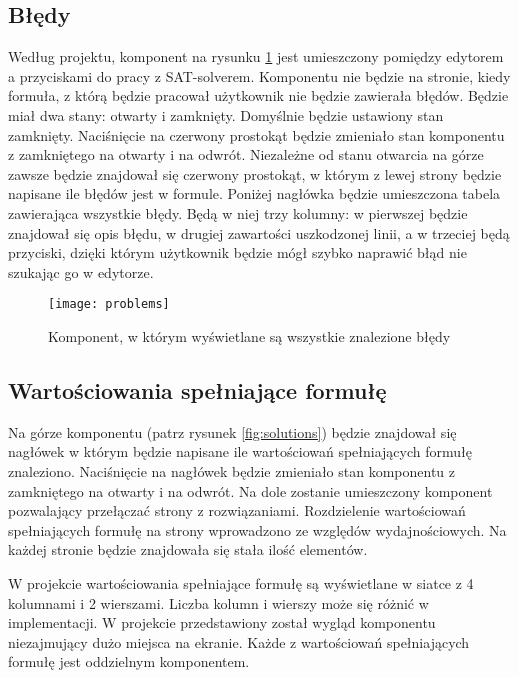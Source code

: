 \documentclass[a4paper,12pt]{book}
\theoremstyle{definition}
\begin{document}

\subsection{Błędy}

Według projektu, komponent na rysunku \ref{fig:problems} jest umieszczony pomiędzy edytorem a przyciskami do pracy z SAT-solverem. Komponentu nie będzie na stronie, kiedy formuła, z którą będzie pracował użytkownik nie będzie zawierała błędów. Będzie miał dwa stany: otwarty i zamknięty. Domyślnie będzie ustawiony stan zamknięty. Naciśnięcie na czerwony prostokąt będzie zmieniało stan komponentu z zamkniętego na otwarty i na odwrót. Niezależne od stanu otwarcia na górze zawsze będzie znajdował się czerwony prostokąt, w którym z lewej strony będzie napisane ile błędów jest w formule. Poniżej nagłówka będzie umieszczona tabela zawierająca wszystkie błędy. Będą w niej trzy kolumny: w pierwszej będzie znajdował się opis błędu, w drugiej zawartości uszkodzonej linii, a w trzeciej będą przyciski, dzięki którym użytkownik będzie mógł szybko naprawić błąd nie szukając go w edytorze.

\begin{figure}[ht]
    \centering
    \texttt{[image: problems]}
    \caption{Komponent, w którym wyświetlane są wszystkie znalezione błędy}
    \label{fig:problems}
\end{figure}

\subsection{Wartościowania spełniające formułę}

Na górze komponentu (patrz rysunek \ref{fig:solutions}) będzie znajdował się nagłówek w którym będzie napisane ile wartościowań spełniających formułę znaleziono. Naciśnięcie na nagłówek będzie zmieniało stan komponentu z zamkniętego na otwarty i na odwrót. Na dole zostanie umieszczony komponent pozwalający przełączać strony z rozwiązaniami. Rozdzielenie wartościowań spełniających formułę na strony wprowadzono ze względów wydajnościowych. Na każdej stronie będzie znajdowała się stała ilość elementów.

W projekcie wartościowania spełniające formułę są wyświetlane w siatce z 4 kolumnami i 2 wierszami. Liczba kolumn i wierszy może się różnić w implementacji. W projekcie przedstawiony został wygląd komponentu niezajmujący dużo miejsca na ekranie. Każde z wartościowań spełniających formułę jest oddzielnym komponentem.
\end{document}
